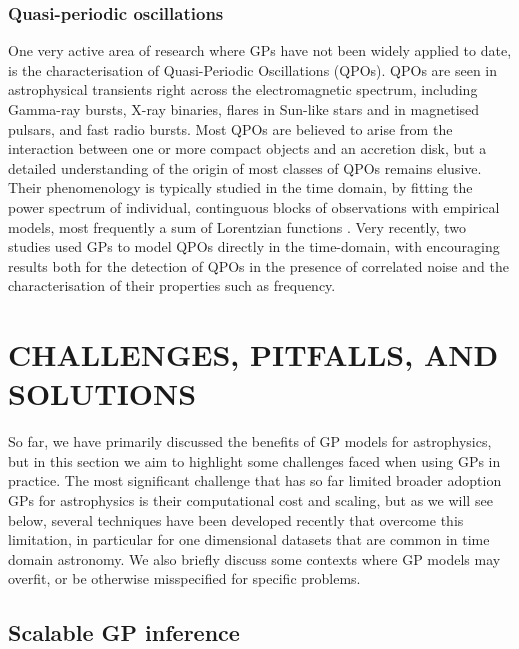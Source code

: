 \documentclass[letterpaper]{ar-1col}
\begin{document}
\subsubsection{Quasi-periodic oscillations}

One very active area of research where GPs have not been widely applied to date, is the characterisation of Quasi-Periodic Oscillations (QPOs). QPOs are seen in astrophysical transients right across the electromagnetic spectrum, including Gamma-ray bursts, X-ray binaries, flares in Sun-like stars and in magnetised pulsars, and fast radio bursts. Most QPOs are believed to arise from the interaction between one or more compact objects and an accretion disk, but a detailed understanding of the origin of most classes of QPOs remains elusive. Their phenomenology is typically studied in the time domain, by fitting the power spectrum of individual, continguous blocks of observations with empirical models, most frequently a sum of Lorentzian functions \citep[see][and references therein]{ingram_motta_QPOs}. Very recently, two studies \citep{Yang_2021,2022ApJ...936...17H} used GPs to model QPOs directly in the time-domain, with encouraging results both for the detection of QPOs in the presence of correlated noise and the characterisation of their properties such as frequency.

\section{CHALLENGES, PITFALLS, AND SOLUTIONS}
\label{sec:challenges}

So far, we have primarily discussed the benefits of GP models for astrophysics, but in this section we aim to highlight some challenges faced when using GPs in practice.
The most significant challenge that has so far limited broader adoption GPs for astrophysics is their computational cost and scaling, but as we will see below, several techniques have been developed recently that overcome this limitation, in particular for one dimensional datasets that are common in time domain astronomy.
We also briefly discuss some contexts where GP models may overfit, or be otherwise misspecified for specific problems.

\subsection{Scalable GP inference}
\label{sec:fast}
\end{document}
